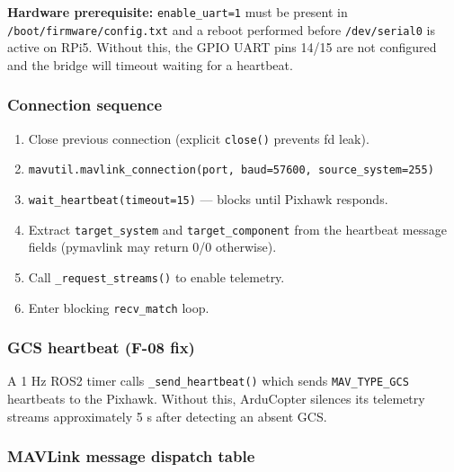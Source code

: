 \documentclass[11pt,a4paper]{article}
\begin{document}
\begin{warnbox}
\textbf{Hardware prerequisite:} \texttt{enable\_uart=1} must be present in
\texttt{/boot/firmware/config.txt} and a reboot performed before
\texttt{/dev/serial0} is active on RPi5. Without this, the GPIO UART pins
14/15 are not configured and the bridge will timeout waiting for a heartbeat.
\end{warnbox}

\subsubsection{Connection sequence}

\begin{enumerate}
  \item Close previous connection (explicit \texttt{close()} prevents fd leak).
  \item \texttt{mavutil.mavlink\_connection(port, baud=57600, source\_system=255)}
  \item \texttt{wait\_heartbeat(timeout=15)} — blocks until Pixhawk responds.
  \item Extract \texttt{target\_system} and \texttt{target\_component} from the
        heartbeat message fields (pymavlink may return 0/0 otherwise).
  \item Call \texttt{\_request\_streams()} to enable telemetry.
  \item Enter blocking \texttt{recv\_match} loop.
\end{enumerate}

\subsubsection{GCS heartbeat (F-08 fix)}

A 1 Hz ROS2 timer calls \texttt{\_send\_heartbeat()} which sends
\texttt{MAV\_TYPE\_GCS} heartbeats to the Pixhawk. Without this, ArduCopter
silences its telemetry streams approximately 5 s after detecting an absent GCS.

\subsubsection{MAVLink message dispatch table}
\end{document}
